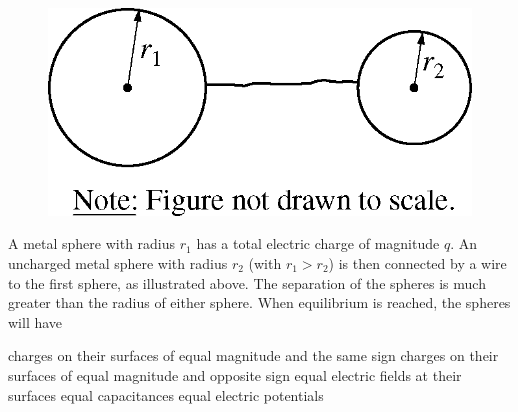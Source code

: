 \begin{figure}[H]
    \center
    \includegraphics[scale=0.25]{images/img-006-014.png}
\end{figure}

\begin{questions}\setcounter{question}{13}\question
A metal sphere with radius $r_{1}$ has a total electric charge of magnitude $q$. An uncharged metal sphere with radius $r_{2}$ (with $r_{1}>r_{2}$) is then connected by a wire to the first sphere, as illustrated above. The separation of the spheres is much greater than the radius of either sphere. When equilibrium is reached, the spheres will have

\begin{choices}
\choice charges on their surfaces of equal magnitude and the same sign
\choice charges on their surfaces of equal magnitude and opposite sign
\choice equal electric fields at their surfaces
\choice equal capacitances
\choice equal electric potentials
\end{choices}\end{questions}

